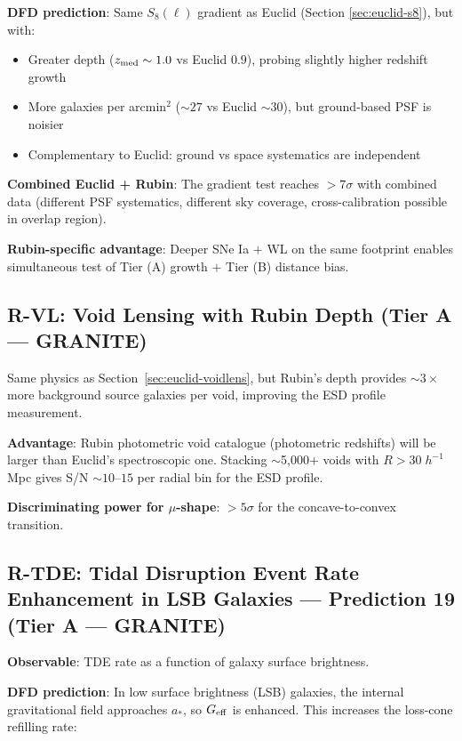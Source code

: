 \documentclass[11pt,a4paper]{article}
\newcommand{\Geff}{G_{\rm eff}}
\begin{document}
\textbf{DFD prediction}: Same $S_8(\ell)$ gradient as Euclid (Section
\ref{sec:euclid-s8}), but with:
\begin{itemize}[nosep]
\item Greater depth ($z_{\rm med} \sim 1.0$ vs Euclid $0.9$), probing
  slightly higher redshift growth
\item More galaxies per arcmin$^2$ ($\sim 27$ vs Euclid $\sim 30$),
  but ground-based PSF is noisier
\item Complementary to Euclid: ground vs space systematics are
  independent
\end{itemize}

\textbf{Combined Euclid + Rubin}: The gradient test reaches
$> 7\sigma$ with combined data (different PSF systematics, different
sky coverage, cross-calibration possible in overlap region).

\textbf{Rubin-specific advantage}: Deeper SNe Ia $+$ WL on the same
footprint enables simultaneous test of Tier (A) growth $+$ Tier (B)
distance bias.


\subsection{R-VL: Void Lensing with Rubin Depth
(Tier A --- GRANITE)}
\label{sec:rubin-voidlens}

Same physics as Section~\ref{sec:euclid-voidlens}, but Rubin's depth
provides $\sim 3\times$ more background source galaxies per void,
improving the ESD profile measurement.

\textbf{Advantage}: Rubin photometric void catalogue (photometric
redshifts) will be larger than Euclid's spectroscopic one. Stacking
$\sim$5,000+ voids with $R > 30\;h^{-1}$Mpc gives S/N $\sim 10$--$15$
per radial bin for the ESD profile.

\textbf{Discriminating power for $\mu$-shape}: $> 5\sigma$ for the
concave-to-convex transition.


\subsection{R-TDE: Tidal Disruption Event Rate Enhancement in LSB
Galaxies --- Prediction 19 (Tier A --- GRANITE)}
\label{sec:rubin-tde}

\textbf{Observable}: TDE rate as a function of galaxy surface
brightness.

\textbf{DFD prediction}: In low surface brightness (LSB) galaxies,
the internal gravitational field approaches $a_*$, so $\Geff$ is
enhanced. This increases the loss-cone refilling rate:
\end{document}

